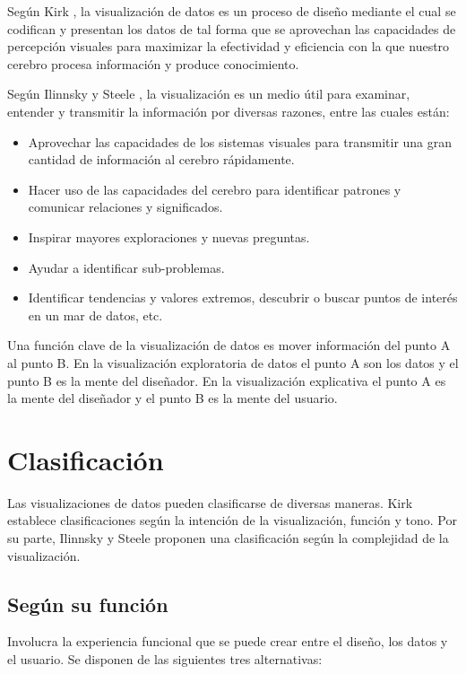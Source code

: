 Según Kirk \cite{Kir12}, la visualización de datos es un proceso de diseño mediante el cual se codifican y presentan los datos de tal forma que se aprovechan las capacidades de percepción visuales para maximizar la efectividad y eficiencia con la que nuestro cerebro procesa información y produce conocimiento.

Según Ilinnsky y Steele \cite{Ste11}, la visualización es un medio útil para examinar, entender y transmitir la información por diversas razones, entre las cuales están:

\begin{itemize}
  \item Aprovechar las capacidades de los sistemas visuales para transmitir una gran cantidad de información al cerebro rápidamente.
  \item Hacer uso de las capacidades del cerebro para identificar patrones y comunicar relaciones y significados.
  \item Inspirar mayores exploraciones y nuevas preguntas.
  \item Ayudar a identificar sub-problemas.
  \item Identificar tendencias y valores extremos, descubrir o buscar puntos de interés en un mar de datos, etc.
\end{itemize}

Una función clave de la visualización de datos es mover información del punto A al punto B. En la visualización exploratoria de datos el punto A son los datos y el punto B es la mente del diseñador. En la visualización explicativa el punto A es la mente del diseñador y el punto B es la mente del usuario.

\section{Clasificación}
Las visualizaciones de datos pueden clasificarse de diversas maneras. Kirk \cite{Kir12} establece clasificaciones según la intención de la visualización, función y tono. Por su parte, Ilinnsky y Steele \cite{Ste11} proponen una clasificación según la complejidad de la visualización.

\subsection{Según su función}

Involucra la experiencia funcional que se puede crear entre el diseño, los datos y el usuario. Se disponen de las siguientes tres alternativas:

